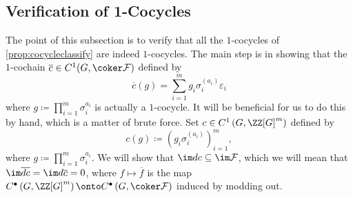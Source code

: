 \documentclass{article}
\numberwithin{equation}{section}
\begin{document}
\subsection{Verification of 1-Cocycles}
The point of this subsection is to verify that all the $1$-cocycles of \autoref{prop:cocycleclassify} are indeed $1$-cocycles. The main step is in showing that the $1$-cochain $\overline c\in C^1(G,\coker\mathcal F)$ defined by
\[\overline c(g)=\sum_{i=1}^mg_i\sigma_i^{(a_i)}\varepsilon_i\]
where $g\coloneqq\prod_{i=1}^m\sigma_i^{a_i}$ is actually a $1$-cocycle. It will be beneficial for us to do this by hand, which is a matter of brute force. Set $c\in C^1\left(G,\ZZ[G]^m\right)$ defined by
\[c(g)\coloneqq\left(g_i\sigma_i^{(a_i)}\right)^m_{i=1},\]
where $g\coloneqq\prod_{i=1}^m\sigma_i^{a_i}$. We will show that $\im dc\subseteq\im\mathcal F$, which we will mean that $\im\overline{dc}=\im d\overline c=0$, where $f\mapsto\overline f$ is the map $C^\bullet\left(G,\ZZ[G]^m\right)\onto C^\bullet\left(G,\coker\mathcal F\right)$ induced by modding out.
\end{document}
